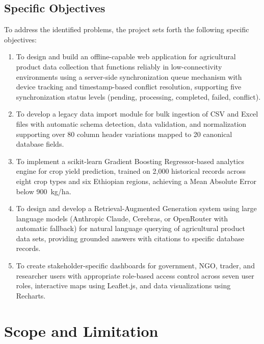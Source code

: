 \documentclass[12pt,a4paper,oneside]{report}
\begin{document}
\subsection{Specific Objectives}
To address the identified problems, the project sets forth the following specific objectives:
\begin{enumerate}
  \item To design and build an offline-capable web application for agricultural product data collection that functions reliably in low-connectivity environments using a server-side synchronization queue mechanism with device tracking and timestamp-based conflict resolution, supporting five synchronization status levels (pending, processing, completed, failed, conflict).
  \item To develop a legacy data import module for bulk ingestion of CSV and Excel files with automatic schema detection, data validation, and normalization supporting over 80 column header variations mapped to 20 canonical database fields.
  \item To implement a scikit-learn Gradient Boosting Regressor-based analytics engine for crop yield prediction, trained on 2,000 historical records across eight crop types and six Ethiopian regions, achieving a Mean Absolute Error below 900~kg/ha.
  \item To design and develop a Retrieval-Augmented Generation system using large language models (Anthropic Claude, Cerebras, or OpenRouter with automatic fallback) for natural language querying of agricultural product data sets, providing grounded answers with citations to specific database records.
  \item To create stakeholder-specific dashboards for government, NGO, trader, and researcher users with appropriate role-based access control across seven user roles, interactive maps using Leaflet.js, and data visualizations using Recharts.
\end{enumerate}

\section{Scope and Limitation}
\end{document}
